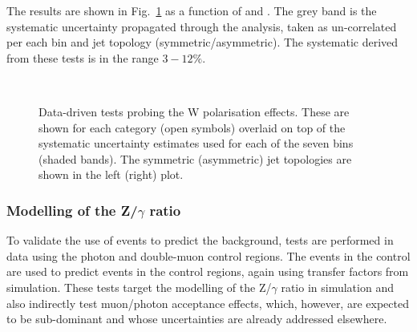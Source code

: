 The results are shown in Fig.~\ref{fig:closureMuPToMuM} as a function
of \scalht and \njet.  The grey band is the systematic uncertainty
propagated through the analysis, taken as un-correlated per each
\scalht bin and jet topology (symmetric/asymmetric). The systematic
derived from these tests is in the range $3-12\%$.

\begin{figure}[h!]
  \begin{center}
    ~~
    \caption{Data-driven tests probing the W polarisation effects. 
      These are shown for each
      \njet category (open symbols) overlaid on top of the systematic
      uncertainty estimates used for each of the seven \scalht bins
      (shaded bands). 
      The symmetric (asymmetric) jet topologies are shown in the left (right) plot.       
    }
    \label{fig:closureMuPToMuM}
  \end{center} 
\end{figure}

\subsubsection*{Modelling of the Z/$\gamma$ ratio}
\label{sec:tfSyst_ZGratio}
To validate the use of \gj events to predict the \znunu background,
tests are performed in data using the photon and double-muon control
regions. The events in the \gj control are used to predict events in
the \mmj control regions, again using transfer factors from simulation.
These tests target the modelling of the Z/$\gamma$ ratio in simulation
and also indirectly test muon/photon acceptance effects, which,
however, are expected to be sub-dominant and whose uncertainties are
already addressed elsewhere. 

